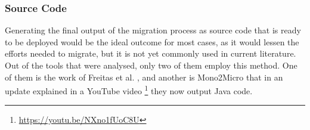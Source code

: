 \subsubsection*{Source Code}

Generating the final output of the migration process as source code that is
ready to be deployed would be the ideal outcome for most cases, as it would
lessen the efforts needed to migrate, but it is not yet commonly used in
current literature. Out of the tools that were analysed, only two of them
employ this method. One of them is the work of Freitas et al.
, and another is Mono2Micro
 that in an update explained in a YouTube video
\footnote{\url{https://youtu.be/NXno1fUoC8U}} they now output Java code.
